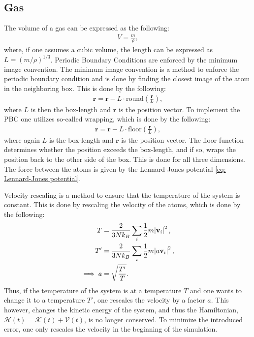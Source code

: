 \documentclass[a4paper]{article}
\newcommand{\newparagraph}{\vspace{.5cm}\noindent}
\begin{document}
\subsection{Gas}
The volume of a gas can be expressed as the following:
\begin{align*}
    V = \frac{m}{\rho},
\end{align*}where, if one assumes a cubic volume, the length can be expressed as $L = (m/\rho)^{1/3}$. Periodic Boundary Conditions are enforced by the minimum image convention.
The minimum image convention is a method to enforce the periodic boundary condition and is done by finding the closest image of the atom in the neighboring box. This is done by the following:
\begin{align*}
    \mathbf{r}= \mathbf{r} - L\cdot\text{round}\left(\frac{\mathbf{r}}{L}\right),
\end{align*}where $L$ is then the box-length and $\mathbf{r}$ is the position vector. To implement the PBC one utilizes so-called wrapping, which is done by the following:
\begin{align*}
    \mathbf{r} = \mathbf{r} - L\cdot\text{floor}\left(\frac{\mathbf{r}}{L}\right),
\end{align*}where again $L$ is the box-length and $\mathbf{r}$ is the position vector. The floor function determines whether the position exceeds the box-length, and if so, wraps the position back to the other side of the box. This is done for all three dimensions. The force between the atoms is given by the Lennard-Jones potential \eqref{eq: Lennard-Jones potential}.

\newparagraph
Velocity rescaling is a method to ensure that the temperature of the system is constant. This is done by rescaling the velocity of the atoms, which is done by the following:
\begin{align}
    T &= \frac{2}{3Nk_B}\sum_i \frac{1}{2}m\abs{\mathbf{v}_i}^2,\nonumber\\
    T' &= \frac{2}{3Nk_B}\sum_i \frac{1}{2}m\abs{a\mathbf{v}_i}^2,\nonumber\\
    \implies a &= \sqrt{\frac{T'}{T}}.\label{eq: velocity rescaling}
\end{align}Thus, if the temperature of the system is at a temperature $T$ and one wants to change it to a temperature $T'$, one rescales the velocity by a factor $a$. This however, changes the kinetic energy of the system, and thus the Hamiltonian, $\mathcal{H}(t) = \mathcal{K}(t) + \mathcal{V}(t)$, is no longer conserved.
To minimize the introduced error, one only rescales the velocity in the beginning of the simulation.
\end{document}
